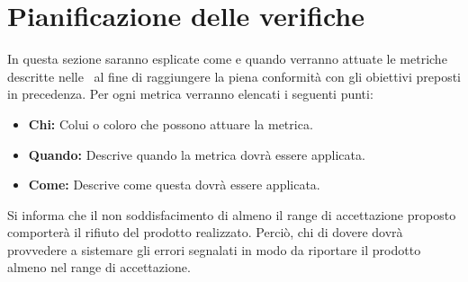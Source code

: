 \section{Pianificazione delle verifiche}
In questa sezione saranno esplicate come e quando verranno attuate le metriche descritte nelle \NdP\ al fine di raggiungere la piena conformità con gli obiettivi preposti in precedenza.
Per ogni metrica verranno elencati i seguenti punti:
\begin{itemize}
\item \textbf{Chi:} Colui o coloro che possono attuare la metrica.
\item \textbf{Quando:} Descrive quando la metrica dovrà essere applicata.
\item \textbf{Come:} Descrive come questa dovrà essere applicata.
\end{itemize}

Si informa che il non soddisfacimento di almeno il range di accettazione proposto comporterà il rifiuto del prodotto realizzato. Perciò, chi di dovere dovrà provvedere a sistemare gli errori segnalati in modo da riportare il prodotto almeno nel range di accettazione. 



%




